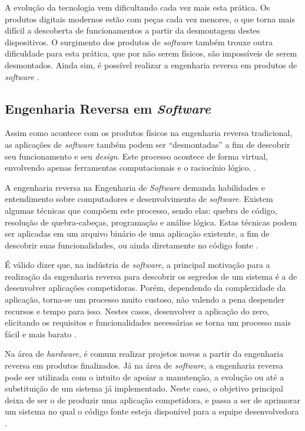 A evolução da tecnologia vem dificultando cada vez mais esta prática. Os produtos digitais modernos 
estão com peças cada vez menores, o que torna mais difícil a descoberta de funcionamentos a partir 
da desmontagem destes dispositivos. O surgimento dos produtos de \textit{software} também trouxe outra dificuldade 
para esta prática, que por não serem físicos, são impossíveis de serem desmontados. Ainda sim, é possível 
realizar a engenharia reversa em produtos de \textit{software} \cite{eilam2011reversing}.

\subsection{Engenharia Reversa em \textit{Software}}
\label{engenharia-reversa}

Assim como acontece com os produtos físicos na engenharia reversa tradicional, as aplicações de \textit{software} 
também podem ser “desmontadas” a fim de descobrir seu funcionamento e seu \textit{design}. Este processo acontece 
de forma virtual, envolvendo apenas ferramentas computacionais e o raciocínio lógico. \cite{eilam2011reversing}.

A engenharia reversa na Engenharia de \textit{Software} demanda habilidades e entendimento sobre computadores e 
desenvolvimento de \textit{software}. Existem algumas técnicas que compõem este processo, sendo elas: quebra de 
código, resolução de quebra-cabeças, programação e análise lógica. Estas técnicas podem ser aplicadas em 
um arquivo binário de uma aplicação existente, a fim de descobrir suas funcionalidades, ou ainda diretamente 
no código fonte \cite{eilam2011reversing}.

É válido dizer que, na indústria de \textit{software}, a principal motivação para a realização da engenharia reversa 
para descobrir os segredos de um sistema é a de desenvolver aplicações competidoras. Porém, dependendo da 
complexidade da aplicação, torna-se um processo muito custoso, não valendo a pena despender recursos e tempo 
para isso. Nestes casos, desenvolver a aplicação do zero, elicitando os requisitos e funcionalidades necessárias 
se torna um processo mais fácil e mais barato \cite{eilam2011reversing}.

Na área de \textit{hardware}, é comum realizar projetos novos a partir  da engenharia reversa em produtos finalizados. 
Já na área de \textit{software}, a engenharia reversa pode ser utilizada com o intuito de apoiar a manutenção, a evolução 
ou até a substituição de um sistema já implementado. Neste caso, o objetivo principal deixa de ser o de produzir 
uma aplicação competidora, e passa a ser de aprimorar um sistema no qual o código fonte esteja disponível para a 
equipe desenvolvedora \cite{cagnin2005parfait}.

